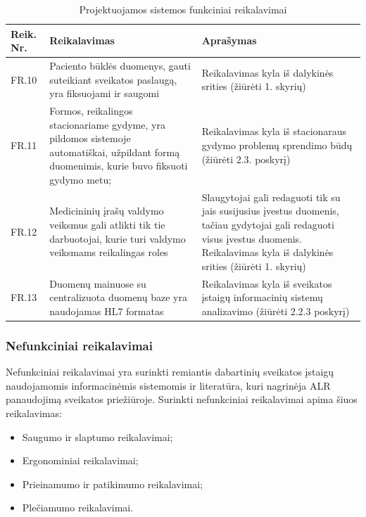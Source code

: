\begin{table}[!ht]
    \centering
    \renewcommand{\arraystretch}{1.2}
    \renewcommand\thetable{5}
    \begin{tabular}{|m{3em}|m{17em}|m{17em}|}
    \hline 
    \rowcolor[HTML]{EFEFEF} 
    Reik. Nr. & Reikalavimas & Aprašymas \\ \hline
    FR.10  &  Paciento būklės duomenys, gauti suteikiant sveikatos paslaugą, yra fiksuojami ir saugomi  &    Reikalavimas kyla iš dalykinės srities (žiūrėti 1. skyrių)       \\ \hline
    FR.11  &  Formos, reikalingos stacionariame gydyme, yra pildomos sistemoje automatiškai, užpildant formą duomenimis, kurie buvo fiksuoti gydymo metu;  &   Reikalavimas kyla iš stacionaraus gydymo problemų sprendimo būdų  (žiūrėti 2.3. poskyrį)       \\ \hline
    FR.12  &  Medicininių įrašų valdymo veiksmus gali atlikti tik tie darbuotojai, kurie turi valdymo veiksmams reikalingas roles  &  
    Slaugytojai gali redaguoti tik su jais susijusius įvestus duomenis, tačiau gydytojai gali redaguoti visus įvestus duomenis. Reikalavimas kyla iš dalykinės srities (žiūrėti 1. skyrių)       \\ \hline
    FR.13  &  Duomenų mainuose su centralizuota duomenų baze yra naudojamas HL7 formatas  &   Reikalavimas kyla iš sveikatos įstaigų informacinių sistemų analizavimo (žiūrėti 2.2.3 poskyrį)       \\ \hline
    \end{tabular}
    \caption{Projektuojamos sistemos funkciniai reikalavimai} 

\end{table}


\subsubsection{Nefunkciniai reikalavimai}
Nefunkciniai reikalavimai yra surinkti remiantis dabartinių sveikatos įstaigų naudojamomis informacinėmis sistemomis ir literatūra, kuri nagrinėja ALR panaudojimą sveikatos priežiūroje. Surinkti nefunkciniai reikalavimai apima šiuos reikalavimas:
\begin{itemize}
    \item Saugumo ir slaptumo reikalavimai;
    \item Ergonominiai reikalavimai;
    \item Prieinamumo ir patikimumo reikalavimai;
    \item Plečiamumo reikalavimai.
\end{itemize}

